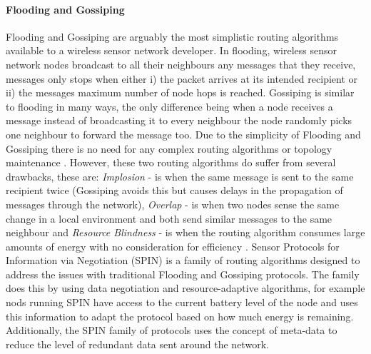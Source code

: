 \paragraph{Flooding and Gossiping} Flooding and Gossiping are arguably the most simplistic routing algorithms available to a wireless sensor network developer. In flooding, wireless sensor network nodes broadcast to all their neighbours any messages that they receive, messages only stops when either i) the packet arrives at its intended recipient or ii) the messages maximum number of node hops is reached. Gossiping is similar to flooding in many ways, the only difference being when a node receives a message instead of broadcasting it to every neighbour the node randomly picks one neighbour to forward the message too. Due to the simplicity of Flooding and Gossiping there is no need for any complex routing algorithms or topology maintenance \cite{Akkaya2005325}. However, these two routing algorithms do suffer from several drawbacks, these are: \emph{Implosion} - is when the same message is sent to the same recipient twice (Gossiping avoids this but causes delays in the propagation of messages through the network), \emph{Overlap} - is when two nodes sense the same change in a local environment and both send similar messages to the same neighbour and \emph{Resource Blindness} -  is when the routing algorithm consumes large amounts of energy with no consideration for efficiency \cite{Akkaya2005325}. Sensor Protocols for Information via Negotiation (SPIN) is a family of routing algorithms designed to address the issues with traditional Flooding and Gossiping protocols\cite{TankBible, Akkaya2005325}. The family does this by using data negotiation and resource-adaptive algorithms, for example nods running SPIN have access to the current battery level of the node and uses this information to adapt the protocol based on how much energy is remaining. Additionally, the SPIN family of protocols uses the concept of meta-data to reduce the level of redundant data sent around the network.

